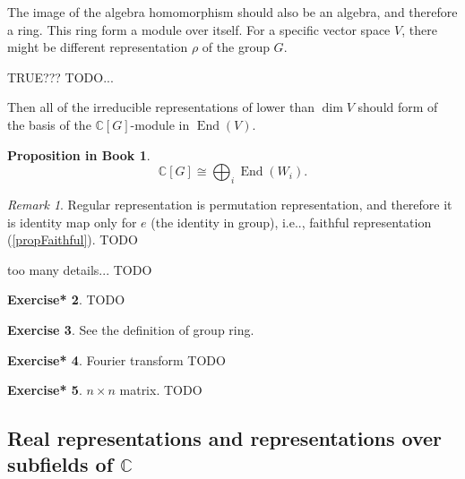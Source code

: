 \documentclass[12pt, letterpaper]{article}
\makeatletter
\newcommand{\co}{\mathbb{C}}
\newcommand{\End}{\operatorname{End}}
\newcommand\ie{i.e\@ifnextchar.{}{.\@}}
\newcommand{\red}[1]{{\color{red} #1}}
\theoremstyle{definition}
\theoremstyle{remark}
\newtheorem*{rem*}{Remark}
\theoremstyle{definition}
\newtheorem{exe}{Exercise}[section]
\newtheorem{exe*}[exe]{Exercise*}
\theoremstyle{plain}
\newtheorem{pprop}[exe]{Proposition in Book}
\numberwithin{equation}{section}
\makeatother
\begin{document}
	The image of the algebra homomorphism should also be an algebra, and therefore a ring.
	This ring form a module over itself.
	For a specific vector space $V$, there might be different representation $\rho$ of the group $G$.
	\red{TRUE??? TODO...
		
		
		 Then all of the irreducible representations of lower than $\dim V$
	should form of the basis of the $\co[G]$-module in $\End(V)$.
	}

	\begin{pprop}
		\[ \co[G]\cong \bigoplus_i\End(W_i).\]
	\end{pprop}
	\begin{rem*}
		Regular representation is permutation representation,
		and therefore it is identity map only for $e$ (the identity in group), \ie, faithful representation (\autoref{propFaithful}).
			\red{TODO}
	\end{rem*}

	\red{too many details... TODO}
	
	\begin{exe*}
		\red{TODO}
	\end{exe*}

	\begin{exe}
		See the definition of group ring.
	\end{exe}
	
	\begin{exe*}
		Fourier transform \red{TODO}
	\end{exe*}
	\begin{exe*}
		$n\times n$ matrix. \red{TODO}
	\end{exe*}

	\subsection{Real representations and representations over subfields of $\co$}
	
\end{document}
